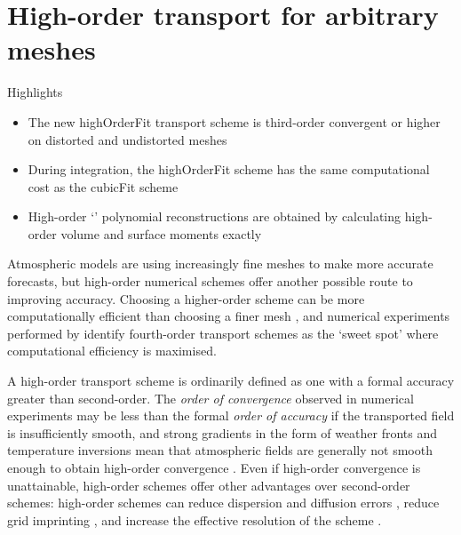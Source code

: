 \chapter{High-order transport for arbitrary meshes}
\label{ch:highOrder}

\begin{highlights}
{\Large Highlights}
\begin{itemize}
	\item The new highOrderFit transport scheme is third-order convergent or higher on distorted and undistorted meshes
	\item During integration, the highOrderFit scheme has the same computational cost as the cubicFit scheme
	\item High-order `\kexact' polynomial reconstructions are obtained by calculating high-order volume and surface moments exactly
\end{itemize}
\end{highlights}

Atmospheric models are using increasingly fine meshes to make more accurate forecasts, but high-order numerical schemes offer another possible route to improving accuracy.
Choosing a higher-order scheme can be more computationally efficient than choosing a finer mesh \citep{waruszewski2018}, and numerical experiments performed by \citet{ullrich2014} identify fourth-order transport schemes as the `sweet spot'  where computational efficiency is maximised.

A high-order transport scheme is ordinarily defined as one with a formal accuracy greater than second-order.
The \emph{order of convergence} observed in numerical experiments may be less than the formal \emph{order of accuracy} if the transported field is insufficiently smooth, and strong gradients in the form of weather fronts and temperature inversions mean that atmospheric fields are generally not smooth enough to obtain high-order convergence \citep{holdaway2008}. 
Even if high-order convergence is unattainable, high-order schemes offer other advantages over second-order schemes: high-order schemes can reduce dispersion and diffusion errors \citep{ullrich-jablonowski2012,waruszewski2018}, reduce grid imprinting \citep{mccorquodale2015}, and increase the effective resolution of the scheme \citep{ullrich2014}.

